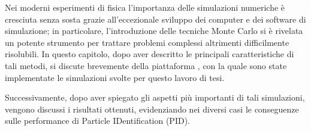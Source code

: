 






Nei moderni esperimenti di fisica l'importanza delle simulazioni numeriche è cresciuta senza sosta grazie all'eccezionale sviluppo dei computer e dei software di simulazione; in particolare, l'introduzione delle tecniche Monte Carlo si è rivelata un potente strumento per trattare problemi complessi altrimenti difficilmente risolubili.
In questo capitolo, dopo aver descritto le principali caratteristiche di tali metodi, si discute brevemente della piattaforma \geant, con la quale sono state implementate le simulazioni svolte per questo lavoro di tesi.

Successivamente, dopo aver spiegato gli aspetti più importanti di tali simulazioni, vengono discussi i risultati ottenuti, evidenziando nei diversi casi le conseguenze sulle performance di Particle IDentification (PID).





\section{}


